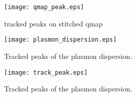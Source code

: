 \begin{figure}
	\centering
	\texttt{[image: qmap\_peak.eps]}
	\caption{tracked peaks on stitched qmap}
	\label{fig:qmap-track}
\end{figure}


\begin{figure}
	\centering
	\texttt{[image: plasmon\_dispersion.eps]}
	\caption{Tracked peaks of the plasmon dispersion.}
	\label{fig:plas_disp}
\end{figure}

\begin{figure}
	\centering
	\texttt{[image: track\_peak.eps]}
	\caption{Tracked peaks of the plasmon dispersion.}
	\label{fig:track_peak}
\end{figure}